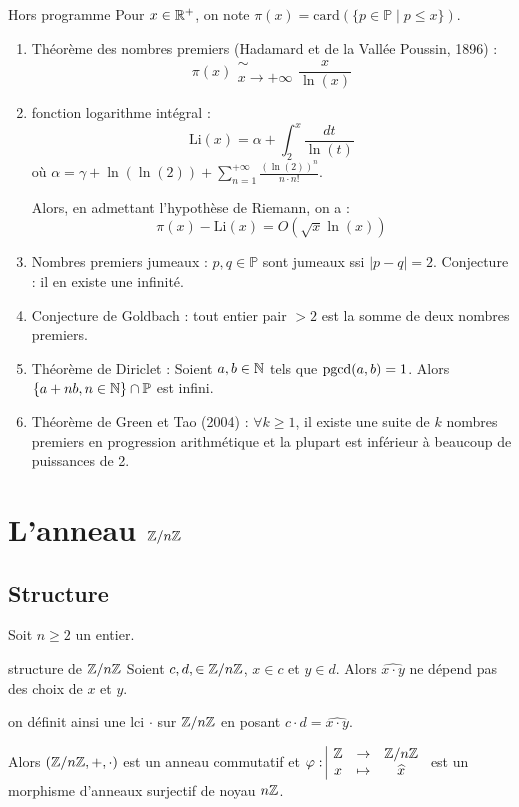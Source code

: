 \begin{proposition}{Hors programme}{}
    Pour $x \in \mathbb{R}^+$, on note $\pi(x) = \text{card}(\{p \in \mathbb{P} \mid p \leqslant x\})$.

    \begin{enumerate}
        \item Théorème des nombres premiers (Hadamard et de la Vallée Poussin, 1896) :
        $$\displaystyle \pi(x) \substack{\sim \\ x \to + \infty} \frac x {\ln(x)}$$
        \item fonction logarithme intégral : 
        $$\displaystyle \mathrm{Li}(x) = \alpha + \int_2^x \frac {dt}{\ln(t)}$$ 
        où $\displaystyle \alpha = \gamma + \ln(\ln(2)) + \sum_{n = 1}^{+\infty} \frac{(\ln(2))^n}{n \cdot n!}$. 

        Alors, en admettant l'hypothèse de Riemann, on a : 
        $$\displaystyle \pi(x)  - \mathrm{Li}(x) = O(\sqrt x \ln(x))$$
        \item Nombres premiers jumeaux : $p, q \in \mathbb P$ sont jumeaux ssi $|p - q| = 2$. 
        Conjecture : il en existe une infinité. 
        \item Conjecture de Goldbach : tout entier pair $> 2$ est la somme de deux nombres premiers.
    
        \item Théorème de Diriclet : Soient $a, b \in \mathbb{N}$ tels que $\operatorname{pgcd}(a, b) = 1$. Alors 
        $\{a + nb, n \in \mathbb{N}\} \cap \mathbb P$ est infini.
        \item Théorème de Green et Tao (2004) : $\forall k \geqslant 1$, il existe une suite de $k$ nombres premiers 
        en progression arithmétique et la plupart est inférieur à beaucoup de puissances de 2.
    \end{enumerate}
     
\end{proposition}

\section{L'anneau \texorpdfstring{$\mathbb{Z} / n \mathbb{Z}$}{Z/nZ}}
\subsection{Structure}

Soit $n \geqslant 2$ un entier.

\begin{theoreme}{structure de $\mathbb{Z} / n \mathbb{Z}$}{}
    Soient $c, d, \in \mathbb{Z}/ n \mathbb{Z}$, $x \in c $ et $y \in d$. Alors 
    $\widehat{x \cdot y}$ ne dépend pas des choix de $x$ et $y$.

    on définit ainsi une lci $\cdot$ sur $\mathbb{Z} / n \mathbb{Z}$  en posant $c \cdot d = \widehat{x \cdot y}$.

    Alors $(\mathbb{Z} / n \mathbb{Z}, +, \cdot)$ est un anneau commutatif et $\varphi: \space \begin{array}{|ccc} \displaystyle \mathbb{Z} & \to & \displaystyle \mathbb{Z} / n \mathbb{Z} \\ \displaystyle x & \mapsto & \displaystyle \widehat x \end{array}$ est un morphisme d'anneaux
    surjectif de noyau $n \mathbb{Z}$.
\end{theoreme}


